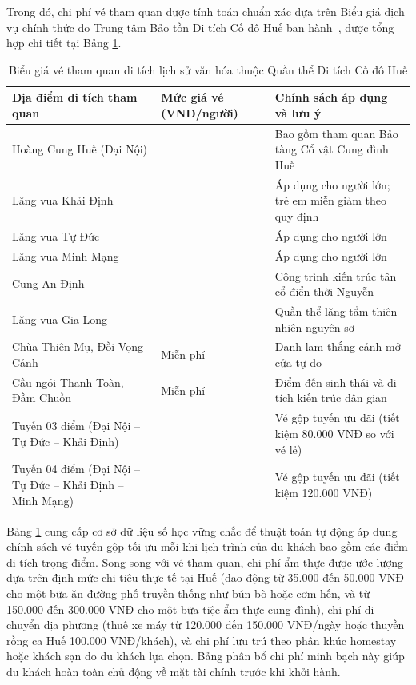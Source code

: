Trong đó, chi phí vé tham quan được tính toán chuẩn xác dựa trên Biểu giá dịch vụ chính thức do Trung tâm Bảo tồn Di tích Cố đô Huế ban hành~\cite{hmdc2024tickets}, được tổng hợp chi tiết tại Bảng \ref{tab:hmdc-ticket-pricing}.

\begin{table}[htbp]
\centering
\caption{Biểu giá vé tham quan di tích lịch sử văn hóa thuộc Quần thể Di tích Cố đô Huế}
\label{tab:hmdc-ticket-pricing}
\footnotesize
\renewcommand{\arraystretch}{1.15}
\begin{tabularx}{\textwidth}{>{\raggedright\arraybackslash}p{5.8cm} >{\centering\arraybackslash}p{2.6cm} >{\raggedright\arraybackslash}X}
\hline
\textbf{Địa điểm di tích tham quan} & \textbf{Mức giá vé (VNĐ/người)} & \textbf{Chính sách áp dụng và lưu ý} \\
\hline
Hoàng Cung Huế (Đại Nội) & 200.000 & Bao gồm tham quan Bảo tàng Cổ vật Cung đình Huế \\
Lăng vua Khải Định & 150.000 & Áp dụng cho người lớn; trẻ em miễn giảm theo quy định \\
Lăng vua Tự Đức & 150.000 & Áp dụng cho người lớn \\
Lăng vua Minh Mạng & 150.000 & Áp dụng cho người lớn \\
Cung An Định & 50.000 & Công trình kiến trúc tân cổ điển thời Nguyễn \\
Lăng vua Gia Long & 50.000 & Quần thể lăng tẩm thiên nhiên nguyên sơ \\
Chùa Thiên Mụ, Đồi Vọng Cảnh & Miễn phí & Danh lam thắng cảnh mở cửa tự do \\
Cầu ngói Thanh Toàn, Đầm Chuồn & Miễn phí & Điểm đến sinh thái và di tích kiến trúc dân gian \\
\hline
Tuyến 03 điểm (Đại Nội -- Tự Đức -- Khải Định) & 420.000 & Vé gộp tuyến ưu đãi (tiết kiệm 80.000 VNĐ so với vé lẻ) \\
Tuyến 04 điểm (Đại Nội -- Tự Đức -- Khải Định -- Minh Mạng) & 530.000 & Vé gộp tuyến ưu đãi (tiết kiệm 120.000 VNĐ) \\
\hline
\end{tabularx}
\end{table}

Bảng \ref{tab:hmdc-ticket-pricing} cung cấp cơ sở dữ liệu số học vững chắc để thuật toán tự động áp dụng chính sách vé tuyến gộp tối ưu mỗi khi lịch trình của du khách bao gồm các điểm di tích trọng điểm. Song song với vé tham quan, chi phí ẩm thực được ước lượng dựa trên định mức chi tiêu thực tế tại Huế (dao động từ 35.000 đến 50.000 VNĐ cho một bữa ăn đường phố truyền thống như bún bò hoặc cơm hến, và từ 150.000 đến 300.000 VNĐ cho một bữa tiệc ẩm thực cung đình), chi phí di chuyển địa phương (thuê xe máy từ 120.000 đến 150.000 VNĐ/ngày hoặc thuyền rồng ca Huế 100.000 VNĐ/khách), và chi phí lưu trú theo phân khúc homestay hoặc khách sạn do du khách lựa chọn. Bảng phân bổ chi phí minh bạch này giúp du khách hoàn toàn chủ động về mặt tài chính trước khi khởi hành.


